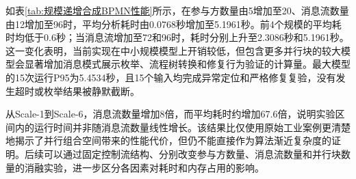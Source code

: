 如表\ref{tab:规模递增合成BPMN性能}所示，在参与方数量由5增加至20、消息流数量由12增加至96时，平均分析耗时由0.0768秒增加至5.1961秒。前4个规模的平均耗时均低于0.6秒；当消息流增加至72和96时，耗时分别上升至2.3086秒和5.1961秒。这一变化表明，当前实现在中小规模模型上开销较低，但包含更多并行块的较大模型会显著增加消息模式展示枚举、流程树转换和修复行为验证的计算量。最大模型的15次运行P95为5.4534秒，且15个输入均完成异常定位和严格修复复验，没有发生超时或枚举结果被静默截断。

从Scale-1到Scale-6，消息流数量增加8倍，而平均耗时约增加67.6倍，说明实验区间内的运行时间并非随消息流数量线性增长。该结果比仅使用原始工业案例更清楚地揭示了并行组合空间带来的性能代价，但仍不能直接作为算法渐近复杂度的证明。后续可以通过固定控制流结构、分别改变参与方数量、消息流数量和并行块数量的消融实验，进一步区分各因素对耗时和内存占用的影响。

